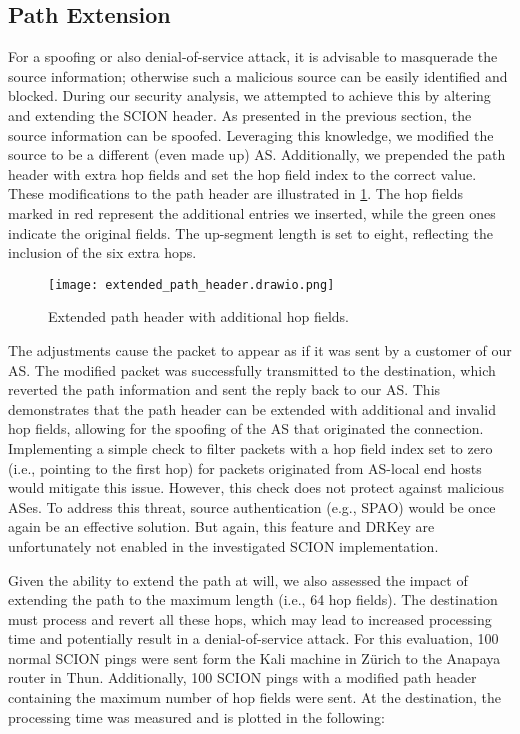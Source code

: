 \subsection{Path Extension}
\label{sec:path-extension}
For a spoofing or also denial-of-service attack, it is advisable to masquerade the source information; otherwise such a malicious source can be easily identified and blocked.
During our security analysis, we attempted to achieve this by altering and extending the SCION header.
As presented in the previous section, the source information can be spoofed.
Leveraging this knowledge, we modified the source to be a different (even made up) AS.
Additionally, we prepended the path header with extra hop fields and set the hop field index to the correct value.
These modifications to the path header are illustrated in \cref{extended_path_header}.
The hop fields marked in red represent the additional entries we inserted, while the green ones indicate the original fields.
The up-segment length is set to eight, reflecting the inclusion of the six extra hops.

\begin{figure}[h]
    \centering
    \texttt{[image: extended\_path\_header.drawio.png]}
    \caption{Extended path header with additional hop fields.}
    \label{extended_path_header}
\end{figure}

The adjustments cause the packet to appear as if it was sent by a customer of our AS.
The modified packet was successfully transmitted to the destination, which reverted the path information and sent the reply back to our AS.
This demonstrates that the path header can be extended with additional and invalid hop fields, allowing for the spoofing of the AS that originated the connection.
Implementing a simple check to filter packets with a hop field index set to zero (i.e., pointing to the first hop) for packets originated from AS-local end hosts would mitigate this issue.
However, this check does not protect against malicious ASes.
To address this threat, source authentication (e.g., SPAO) would be once again be an effective solution.
But again, this feature and DRKey are unfortunately not enabled in the investigated SCION implementation.

Given the ability to extend the path at will, we also assessed the impact of extending the path to the maximum length (i.e., 64 hop fields).
The destination must process and revert all these hops, which may lead to increased processing time and potentially result in a denial-of-service attack.
For this evaluation, 100 normal SCION pings were sent form the Kali machine in Zürich to the Anapaya router in Thun.
Additionally, 100 SCION pings with a modified path header containing the maximum number of hop fields were sent.
At the destination, the processing time was measured and is plotted in the following:


